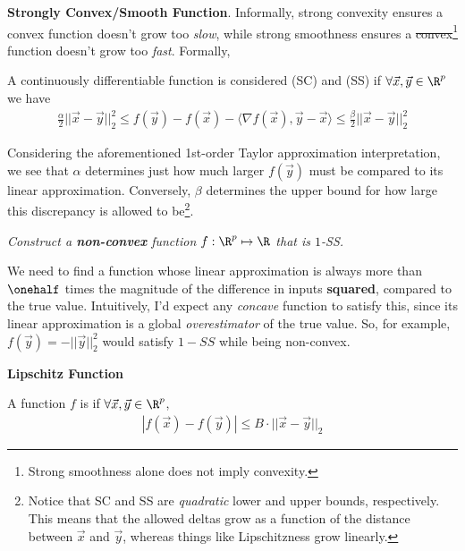 \documentclass[11pt]{article}
\begin{document}
\textbf{Strongly Convex/Smooth Function}. Informally, strong convexity ensures a convex function doesn't grow too \textit{slow}, while strong smoothness ensures a \sout{convex}\footnote{Strong smoothness alone does not imply convexity.} function doesn't grow too \textit{fast}. Formally,
\begin{definition}[-1em]
	A continuously differentiable function is considered  (SC) and  (SS) if $\forall \vec x, \vec y \in \R^p$ we have
	\begin{align}
	\frac{\alpha}{2} || \vec x - \vec y ||_2^2
	\le
	f(\vec y) - f(\vec x) -  \langle \nabla f(\vec x), \vec y - \vec x \rangle 
	\le 
	\frac{\beta}{2} || \vec x - \vec y ||_2^2
	\end{align}
\end{definition}
Considering the aforementioned 1st-order Taylor approximation interpretation, we see that $\alpha$ determines just how much larger $f(\vec y)$ must be compared to its linear approximation. Conversely, $\beta$ determines the upper bound for how large this discrepancy is allowed to be\footnote{Notice that SC and SS are \textit{quadratic} lower and upper bounds, respectively. This means that the allowed deltas grow as a function of the distance between $\vec x$ and $\vec y$, whereas things like Lipschitzness grow linearly.}. 

\begin{example}
	\textit{Construct a \textbf{non-convex} function $f : \R^p \mapsto \R$ that is $1$-SS.}
	\tcblower 
	
	We need to find a function whose linear approximation is always more than $\onehalf$ times the magnitude of the difference in inputs \textbf{squared}, compared to the true value. Intuitively, I'd expect any \textit{concave} function to satisfy this, since its linear approximation is a global \textit{overestimator} of the true value. So, for example, $f(\vec y) = - || \vec y ||_2^2$ would satisfy $1-SS$ while being non-convex.
\end{example}

\textbf{Lipschitz Function}
\begin{definition}[-1em]
	A function $f$ is  if $\forall \vec x, \vec y \in \R^p$,
	\begin{align}
	|f(\vec x) - f(\vec y)| \le B \cdot ||\vec x - \vec y ||_2
	\end{align}
\end{definition}
\end{document}
